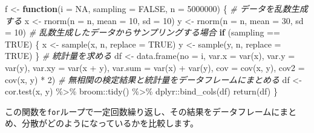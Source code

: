 \documentclass[]{tufte-handout}
\newenvironment{Shaded}{}{}
\newcommand{\AttributeTok}[1]{\textcolor[rgb]{0.49,0.56,0.16}{#1}}
\newcommand{\CommentTok}[1]{\textcolor[rgb]{0.38,0.63,0.69}{\textit{#1}}}
\newcommand{\ConstantTok}[1]{\textcolor[rgb]{0.53,0.00,0.00}{#1}}
\newcommand{\ControlFlowTok}[1]{\textcolor[rgb]{0.00,0.44,0.13}{\textbf{#1}}}
\newcommand{\DecValTok}[1]{\textcolor[rgb]{0.25,0.63,0.44}{#1}}
\newcommand{\FunctionTok}[1]{\textcolor[rgb]{0.02,0.16,0.49}{#1}}
\newcommand{\NormalTok}[1]{#1}
\newcommand{\OtherTok}[1]{\textcolor[rgb]{0.00,0.44,0.13}{#1}}
\newcommand{\SpecialCharTok}[1]{\textcolor[rgb]{0.25,0.44,0.63}{#1}}
\begin{document}
\begin{Shaded}
\begin{Highlighting}[numbers=left,,]
\NormalTok{f }\OtherTok{\textless{}{-}} \ControlFlowTok{function}\NormalTok{(}\AttributeTok{i =} \ConstantTok{NA}\NormalTok{, }\AttributeTok{sampling =} \ConstantTok{FALSE}\NormalTok{, }\AttributeTok{n =} \DecValTok{5000000}\NormalTok{) \{}
  \CommentTok{\# データを乱数生成する}
\NormalTok{  x }\OtherTok{\textless{}{-}} \FunctionTok{rnorm}\NormalTok{(}\AttributeTok{n =}\NormalTok{ n, }\AttributeTok{mean =} \DecValTok{10}\NormalTok{, }\AttributeTok{sd =} \DecValTok{10}\NormalTok{)}
\NormalTok{  y }\OtherTok{\textless{}{-}} \FunctionTok{rnorm}\NormalTok{(}\AttributeTok{n =}\NormalTok{ n, }\AttributeTok{mean =} \DecValTok{30}\NormalTok{, }\AttributeTok{sd =} \DecValTok{10}\NormalTok{)}
  \CommentTok{\# 乱数生成したデータからサンプリングする場合}
  \ControlFlowTok{if}\NormalTok{ (sampling }\SpecialCharTok{==} \ConstantTok{TRUE}\NormalTok{) \{}
\NormalTok{    x }\OtherTok{\textless{}{-}} \FunctionTok{sample}\NormalTok{(x, n, }\AttributeTok{replace =} \ConstantTok{TRUE}\NormalTok{)}
\NormalTok{    y }\OtherTok{\textless{}{-}} \FunctionTok{sample}\NormalTok{(y, n, }\AttributeTok{replace =} \ConstantTok{TRUE}\NormalTok{)}
\NormalTok{  \}}
  \CommentTok{\# 統計量を求める}
\NormalTok{  df }\OtherTok{\textless{}{-}} \FunctionTok{data.frame}\NormalTok{(}\AttributeTok{no =}\NormalTok{ i, }\AttributeTok{var.x =} \FunctionTok{var}\NormalTok{(x), }\AttributeTok{var.y =} \FunctionTok{var}\NormalTok{(y),}
                   \AttributeTok{var.xy =} \FunctionTok{var}\NormalTok{(x }\SpecialCharTok{+}\NormalTok{ y), }\AttributeTok{var.sum =} \FunctionTok{var}\NormalTok{(x) }\SpecialCharTok{+} \FunctionTok{var}\NormalTok{(y),}
                   \AttributeTok{cov =} \FunctionTok{cov}\NormalTok{(x, y), }\AttributeTok{cov2 =} \FunctionTok{cov}\NormalTok{(x, y) }\SpecialCharTok{*} \DecValTok{2}\NormalTok{)}
  \CommentTok{\# 無相関の検定結果と統計量をデータフレームにまとめる}
\NormalTok{  df }\OtherTok{\textless{}{-}} \FunctionTok{cor.test}\NormalTok{(x, y) }\SpecialCharTok{\%\textgreater{}\%}\NormalTok{ broom}\SpecialCharTok{::}\FunctionTok{tidy}\NormalTok{() }\SpecialCharTok{\%\textgreater{}\%}\NormalTok{ dplyr}\SpecialCharTok{::}\FunctionTok{bind\_cols}\NormalTok{(df)}
  \FunctionTok{return}\NormalTok{(df)}
\NormalTok{\}}
\end{Highlighting}
\end{Shaded}

この関数を\texttt{for}ループで一定回数繰り返し、その結果をデータフレームにまとめ、分散がどのようになっているかを比較します。
\end{document}
